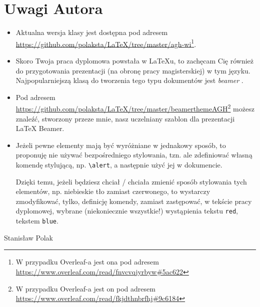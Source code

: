 \chapter{Uwagi Autora}
\begin{itemize}
     \item Aktualna wersja klasy jest dostępna pod adresem \url{https://github.com/polaksta/LaTeX/tree/master/agh-wi}\footnote{W przypadku Overleaf-a jest ona pod adresem  \url{https://www.overleaf.com/read/fnvcvqjyrbyw\#5ac622}}.
    \item Skoro Twoja praca dyplomowa powstała w \LaTeX{}u, to zachęcam Cię również do przygotowania prezentacji (na obronę pracy magisterskiej) w tym języku. Najpopularniejszą klasą do tworzenia tego typu dokumentów jest \emph{beamer} \cite{beamer}.
    \item Pod adresem \url{https://github.com/polaksta/LaTeX/tree/master/beamerthemeAGH}\footnote{W przypadku Overleaf-a jest on pod adresem  \url{https://www.overleaf.com/read/fkjdthnbrfhj\#9c6184}} możesz znaleźć, stworzony przeze mnie,  nasz uczelniany szablon dla prezentacji \LaTeX{} Beamer.
    \item Jeżeli pewne elementy mają być wyróżniane w \alert{jednakowy} \alert{sposób}, to proponuję nie używać bezpośredniego stylowania, tzn.
           ale zdefiniować własną komendę stylującą, np. \verb+\alert+,
          a następnie użyć jej w dokumencie.

          Dzięki temu, jeżeli będziesz chciał / chciała zmienić sposób stylowania tych elementów, np. niebieskie tło zamiast czerwonego, to wystarczy zmodyfikować, tylko, definicję komendy, zamiast zastępować, w tekście pracy dyplomowej, wybrane (niekoniecznie wszystkie!) wystąpienia tekstu \texttt{red}, tekstem \texttt{blue}.
\end{itemize}
Stanisław Polak
